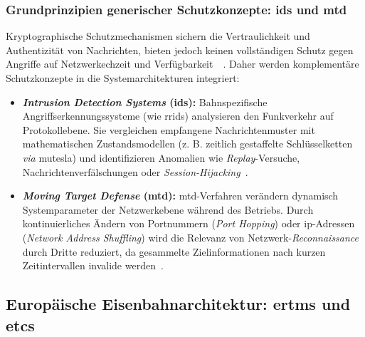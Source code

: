 \documentclass[runningheads]{res/llncs}
\begin{document}

\subsubsection{\texorpdfstring{Grundprinzipien generischer Schutzkonzepte: \gls{ids} und \gls{mtd}}{Grundprinzipien generischer Schutzkonzepte: IDS und MTD}}
\label{sec:Grundprinzipien_generischer_Schutzkonzepte_IDS_und_MTD}
Kryptographische Schutzmechanismen sichern die Vertraulichkeit und Authentizität von Nachrichten, bieten jedoch keinen vollständigen Schutz gegen Angriffe auf Netzwerkechzeit und Verfügbarkeit~\parencite[S. 121]{poschingerOpenMTD2020}~\parencite[S. 60]{melaragnoRail2016}. Daher werden komplementäre Schutzkonzepte in die Systemarchitekturen integriert:

\begin{itemize}
    \item \textbf{\textit{Intrusion Detection Systems} (\gls{ids}):} Bahnspezifische Angriffserkennungssysteme (wie \gls{rrids}) analysieren den Funkverkehr auf Protokollebene. Sie vergleichen empfangene Nachrichtenmuster mit mathematischen Zustandsmodellen (z. B. zeitlich gestaffelte Schlüsselketten \textit{via} \gls{mutesla}) und identifizieren Anomalien wie \textit{Replay}-Versuche, Nachrichtenverfälschungen oder \textit{Session-Hijacking}~\parencite[S. 60--63]{melaragnoRail2016}.
    \item \textbf{\textit{Moving Target Defense} (\gls{mtd}):} \gls{mtd}-Verfahren verändern dynamisch Systemparameter der Netzwerkebene während des Betriebs. Durch kontinuierliches Ändern von Portnummern (\textit{Port Hopping}) oder \gls{ip}-Adressen (\textit{Network Address Shuffling}) wird die Relevanz von Netzwerk-\textit{Reconnaissance} durch Dritte reduziert, da gesammelte Zielinformationen nach kurzen Zeitintervallen invalide werden~\parencite[S. 66, 121]{poschingerOpenMTD2020}.
\end{itemize}

\subsection{\texorpdfstring{Europäische Eisenbahnarchitektur: \gls{ertms} und \gls{etcs}}{Europäische Eisenbahnarchitektur: ERTMS und ETCS}}
\label{sec:Europäische_Eisenbahnarchitektur_ERTMS_und_ETCS}
\end{document}
